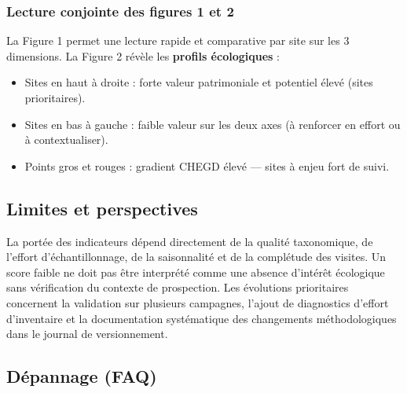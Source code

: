 \documentclass[11pt,a4paper]{article}
\begin{document}
\subsubsection{Lecture conjointe des figures 1 et 2}

La Figure 1 permet une lecture rapide et comparative par site sur les 3 dimensions.
La Figure 2 révèle les \textbf{profils écologiques} :
\begin{itemize}
  \item Sites en haut à droite : forte valeur patrimoniale et potentiel élevé (sites prioritaires).
  \item Sites en bas à gauche : faible valeur sur les deux axes (à renforcer en effort ou à contextualiser).
  \item Points gros et rouges : gradient CHEGD élevé — sites à enjeu fort de suivi.
\end{itemize}

\subsection{Limites et perspectives}
La portée des indicateurs dépend directement de la qualité taxonomique, de l'effort
d'échantillonnage, de la saisonnalité et de la complétude des visites. Un score faible ne doit
pas être interprété comme une absence d'intérêt écologique sans vérification du contexte de
prospection. Les évolutions prioritaires concernent la validation sur plusieurs campagnes,
l'ajout de diagnostics d'effort d'inventaire et la documentation systématique des changements
méthodologiques dans le journal de versionnement.

\subsection{Dépannage (FAQ)}
\end{document}
